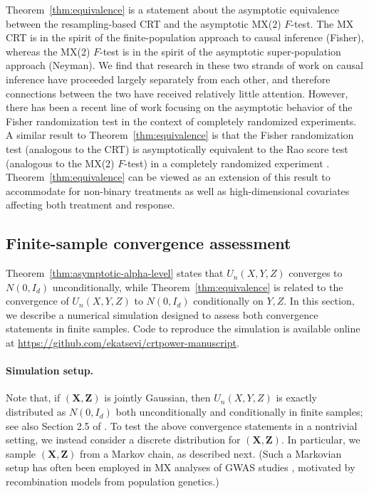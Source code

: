 \documentclass[12pt]{article}
\theoremstyle{definition}
\theoremstyle{remark}
\newcommand{\prx}{\bm X}
\newcommand{\srx}{X}
\newcommand{\prz}{\bm Z}
\newcommand{\srz}{Z}
\newcommand{\sry}{Y}
\begin{document}
Theorem~\ref{thm:equivalence} is a statement about the asymptotic equivalence between the resampling-based CRT and the asymptotic MX(2) $F$-test. The MX CRT is in the spirit of the finite-population approach to causal inference (Fisher), whereas the MX(2) $F$-test is in the spirit of the asymptotic super-population approach (Neyman). We find that research in these two strands of work on causal inference have proceeded largely separately from each other, and therefore connections between the two have received relatively little attention. However, there has been a recent line of work \cite{Ding2017,Wu2020a,Zhao2021} focusing on the asymptotic behavior of the Fisher randomization test in the context of completely randomized experiments. A similar result to Theorem~\ref{thm:equivalence} is that the Fisher randomization test (analogous to the CRT) is asymptotically equivalent to the Rao score test (analogous to the MX(2) $F$-test) in a completely randomized experiment \cite[Theorem A.1]{Ding2017}. Theorem~\ref{thm:equivalence} can be viewed as an extension of this result to accommodate for non-binary treatments as well as high-dimensional covariates affecting both treatment and response.


\subsection{Finite-sample convergence assessment} \label{sec:simulations}

Theorem~\ref{thm:asymptotic-alpha-level} states that $U_n(\srx, \sry, \srz)$ converges to $N(0, I_d)$ unconditionally, while Theorem~\ref{thm:equivalence} is related to the convergence of $U_n(\srx, \sry, \srz)$ to $N(0, I_d)$ conditionally on $\sry, \srz$. In this section, we describe a numerical simulation designed to assess both convergence statements in finite samples. Code to reproduce the simulation is available online at \url{https://github.com/ekatsevi/crtpower-manuscript}.

\paragraph{Simulation setup.}

Note that, if $(\prx,\prz)$ is jointly Gaussian, then $U_n(\srx, \sry, \srz)$ is exactly distributed as $N(0,I_d)$ both unconditionally and conditionally in finite samples; see also Section 2.5 of \cite{Liu2020}. To test the above convergence statements in a nontrivial setting, we instead consider a discrete distribution for $(\prx,\prz)$. In particular, we sample $(\prx, \prz)$ from a Markov chain, as described next. (Such a Markovian setup has often been employed in MX analyses of GWAS studies \cite{SetC17, SetS19, Bates2020}, motivated by recombination models from population genetics.)
\end{document}
